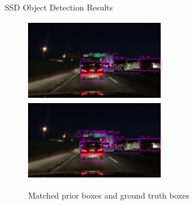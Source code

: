 \documentclass[10pt, aspectratio=169]{beamer}
\begin{document}
\begin{frame}{SSD Object Detection Results}

    \begin{figure}%
        \centering
        \includegraphics[width=6cm, height=3.5cm]{images/9.png}
        \includegraphics[width=6cm, height=3.5cm]{images/tuned_9.png}
        \caption{Matched prior boxes and ground truth boxes}%
        \label{fig:example}%
    \end{figure}


    \begin{table}[]
        \caption{Average Precision values using SSD300 model with and without tuned prior boxes}
\end{table}
\end{frame}
\end{document}
